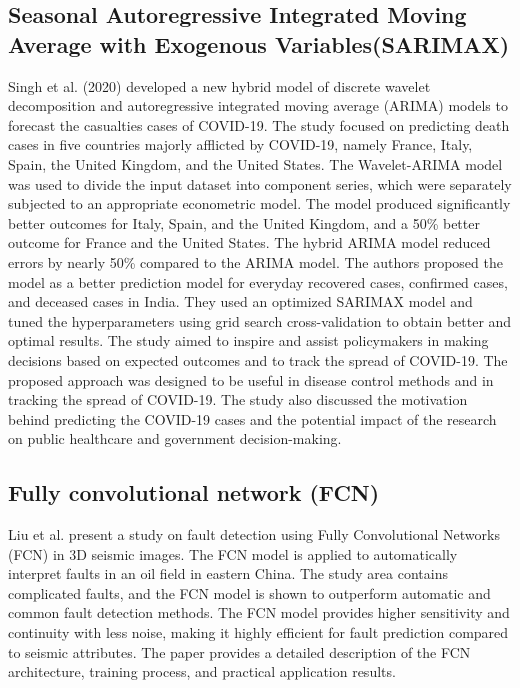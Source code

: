 \documentclass{ieeeojies}
\begin{document}
\subsection{\textbf{Seasonal Autoregressive Integrated Moving Average with Exogenous Variables(SARIMAX)}}
\hspace{0.3cm}Singh et al. (2020) developed a new hybrid model of discrete wavelet decomposition and autoregressive integrated moving average (ARIMA) models to forecast the casualties cases of COVID-19. The study focused on predicting death cases in five countries majorly afflicted by COVID-19, namely France, Italy, Spain, the United Kingdom, and the United States. The Wavelet-ARIMA model was used to divide the input dataset into component series, which were separately subjected to an appropriate econometric model. The model produced significantly better outcomes for Italy, Spain, and the United Kingdom, and a 50\% better outcome for France and the United States. The hybrid ARIMA model reduced errors by nearly 50\% compared to the ARIMA model. The authors proposed the model as a better prediction model for everyday recovered cases, confirmed cases, and deceased cases in India. They used an optimized SARIMAX model and tuned the hyperparameters using grid search cross-validation to obtain better and optimal results. The study aimed to inspire and assist policymakers in making decisions based on expected outcomes and to track the spread of COVID-19. The proposed approach was designed to be useful in disease control methods and in tracking the spread of COVID-19. The study also discussed the motivation behind predicting the COVID-19 cases and the potential impact of the research on public healthcare and government decision-making. 

\subsection{\textbf{Fully convolutional network (FCN)}}
Liu et al.\cite{article8} present a study on fault detection using Fully Convolutional Networks (FCN) in 3D seismic images. The FCN model is applied to automatically interpret faults in an oil field in eastern China. The study area contains complicated faults, and the FCN model is shown to outperform automatic and common fault detection methods. The FCN model provides higher sensitivity and continuity with less noise, making it highly efficient for fault prediction compared to seismic attributes. The paper provides a detailed description of the FCN architecture, training process, and practical application results.
\end{document}
